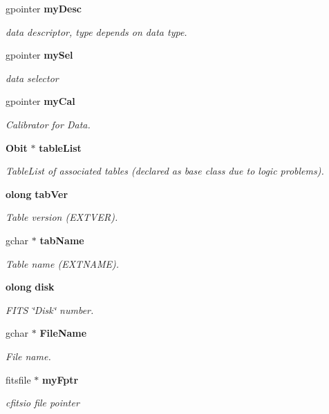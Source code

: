 \begin{CompactItemize}
gpointer {\bf my\-Desc}
\begin{CompactList}\small\item\em data descriptor, type depends on data type. \item\end{CompactList}\item 
gpointer {\bf my\-Sel}
\begin{CompactList}\small\item\em data selector \item\end{CompactList}\item 
gpointer {\bf my\-Cal}
\begin{CompactList}\small\item\em Calibrator for Data. \item\end{CompactList}\item 
{\bf Obit} $\ast$ {\bf table\-List}
\begin{CompactList}\small\item\em Table\-List of associated tables (declared as base class due to logic problems). \item\end{CompactList}\item 
{\bf olong} {\bf tab\-Ver}
\begin{CompactList}\small\item\em Table version (EXTVER). \item\end{CompactList}\item 
gchar $\ast$ {\bf tab\-Name}
\begin{CompactList}\small\item\em Table name (EXTNAME). \item\end{CompactList}\item 
{\bf olong} {\bf disk}
\begin{CompactList}\small\item\em FITS \char`\"{}Disk\char`\"{} number. \item\end{CompactList}\item 
gchar $\ast$ {\bf File\-Name}
\begin{CompactList}\small\item\em File name. \item\end{CompactList}\item 
fitsfile $\ast$ {\bf my\-Fptr}
\begin{CompactList}\small\item\em cfitsio file pointer \item\end{CompactList}\end{CompactItemize}


